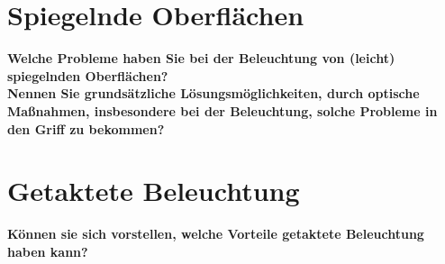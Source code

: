 \documentclass[a4paper]{article}
\begin{document}
	
	\section{Spiegelnde Oberflächen}
	\textbf{Welche Probleme haben Sie bei der Beleuchtung von (leicht) spiegelnden Oberflächen?}\\
	\textbf{Nennen Sie grundsätzliche Lösungsmöglichkeiten, durch optische Maßnahmen, insbesondere bei der Beleuchtung, solche Probleme in den Griff zu bekommen?}\\
	
	\section{Getaktete Beleuchtung}
	\textbf{Können sie sich vorstellen, welche Vorteile getaktete Beleuchtung haben kann?}\\
	

	
\end{document}
